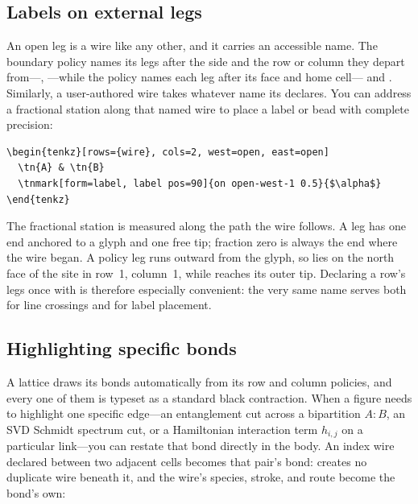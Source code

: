 \subsection{Labels on external legs}

An open leg is a wire like any other, and it carries an accessible name.  The
boundary policy names its legs after the side and the row or column they
depart from---, ---while the
 policy names each leg after its face and home
cell--- and .  Similarly, a user-authored
wire takes whatever name its  declares.  You can address a
fractional station along that named wire to place a label or bead with complete
precision:

\begin{Verbatim}[fontsize=\small,frame=leftline]
\begin{tenkz}[rows={wire}, cols=2, west=open, east=open]
  \tn{A} & \tn{B}
  \tnmark[form=label, label pos=90]{on open-west-1 0.5}{$\alpha$}
\end{tenkz}
\end{Verbatim}

The fractional station is measured along the path the wire follows.  A leg has
one end anchored to a glyph and one free tip; fraction zero is always the end
where the wire began.  A policy leg runs outward from the glyph, so  lies on the north face of the site in row~1, column~1, while
 reaches its outer tip.  Declaring a row's legs once with
 is therefore especially convenient: the very same name
serves both for line crossings and for label placement.

\subsection{Highlighting specific bonds}

A lattice draws its bonds automatically from its row and column policies, and
every one of them is typeset as a standard black contraction.  When a figure
needs to highlight one specific edge---an entanglement cut across a bipartition
$A:B$, an SVD Schmidt spectrum cut, or a Hamiltonian interaction term $h_{i,j}$
on a particular link---you can restate that bond directly in the body.  An
index wire declared between two adjacent cells becomes that pair's bond: \pkg{}
creates no duplicate wire beneath it, and the wire's species, stroke, and route
become the bond's own:

